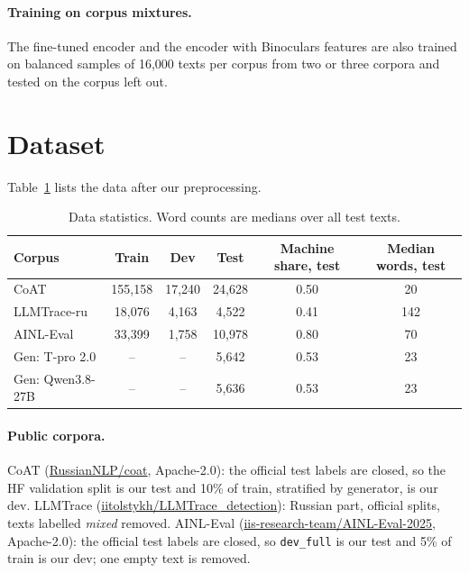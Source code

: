 \documentclass{article}
\begin{document}
\paragraph{Training on corpus mixtures.} The fine-tuned encoder and the encoder with Binoculars features are also
trained on balanced samples of 16,000 texts per corpus from two or three corpora and tested on the corpus left
out.


\section{Dataset}
Table~\ref{tab:statistics} lists the data after our preprocessing.

\begin{table}[tbh!]
\begin{center}
\begin{tabular}{|l|ccc|cc|}
\hline
Corpus & Train & Dev & Test & Machine share, test & Median words, test \\
\hline
CoAT & 155,158 & 17,240 & 24,628 & 0.50 & 20 \\
LLMTrace-ru & 18,076 & 4,163 & 4,522 & 0.41 & 142 \\
AINL-Eval & 33,399 & 1,758 & 10,978 & 0.80 & 70 \\
Gen: T-pro 2.0 & -- & -- & 5,642 & 0.53 & 23 \\
Gen: Qwen3.8-27B & -- & -- & 5,636 & 0.53 & 23 \\
\hline
\end{tabular}
\caption{Data statistics. Word counts are medians over all test texts.}
\label{tab:statistics}
\end{center}
\end{table}

\paragraph{Public corpora.} CoAT (\href{https://huggingface.co/datasets/RussianNLP/coat}{RussianNLP/coat},
Apache-2.0): the official test labels are closed, so the HF validation split is our test and 10\% of train,
stratified by generator, is our dev. LLMTrace
(\href{https://huggingface.co/datasets/iitolstykh/LLMTrace_detection}{iitolstykh/LLMTrace\_detection}): Russian
part, official splits, texts labelled \emph{mixed} removed. AINL-Eval
(\href{https://huggingface.co/datasets/iis-research-team/AINL-Eval-2025}{iis-research-team/AINL-Eval-2025},
Apache-2.0): the official test labels are closed, so \texttt{dev\_full} is our test and 5\% of train is our dev;
one empty text is removed.
\end{document}
